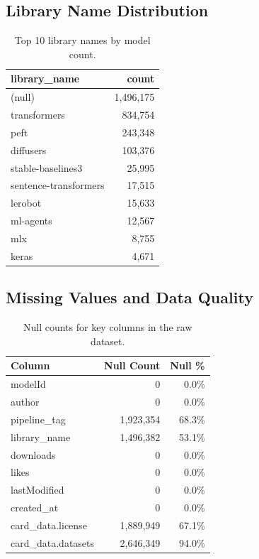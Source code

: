 \documentclass[11pt]{article}
\begin{document}
\subsection{Library Name Distribution}

\begin{table}[H]
\centering
\begin{tabular}{lr}
\toprule
\textbf{library\_name} & \textbf{count} \\
\midrule
(null)                & 1,496,175 \\
transformers          & 834,754 \\
peft                  & 243,348 \\
diffusers             & 103,376 \\
stable-baselines3     & 25,995 \\
sentence-transformers & 17,515 \\
lerobot               & 15,633 \\
ml-agents             & 12,567 \\
mlx                   & 8,755 \\
keras                 & 4,671 \\
\bottomrule
\end{tabular}
\caption{Top 10 library names by model count.}
\end{table}

\subsection{Missing Values and Data Quality}

\begin{table}[H]
\centering
\begin{tabular}{lrr}
\toprule
\textbf{Column} & \textbf{Null Count} & \textbf{Null \%} \\
\midrule
modelId            & 0         & 0.0\% \\
author             & 0         & 0.0\% \\
pipeline\_tag      & 1,923,354 & 68.3\% \\
library\_name      & 1,496,382 & 53.1\% \\
downloads          & 0         & 0.0\% \\
likes              & 0         & 0.0\% \\
lastModified       & 0         & 0.0\% \\
created\_at        & 0         & 0.0\% \\
card\_data.license & 1,889,949 & 67.1\% \\
card\_data.datasets & 2,646,349 & 94.0\% \\
\bottomrule
\end{tabular}
\caption{Null counts for key columns in the raw dataset.}
\end{table}
\end{document}
